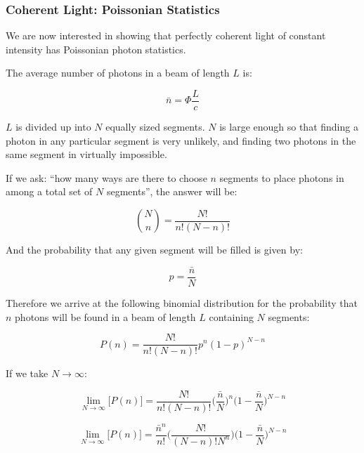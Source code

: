 \documentclass[12pt,a4paper]{report}
\begin{document}
\subsubsection{Coherent Light: Poissonian Statistics}\label{poissonian.statistics.with.photons}

We are now interested in showing that perfectly coherent light of constant intensity has Poissonian photon statistics.

The average number of photons in a beam of length $L$ is:

\begin{equation}
    \bar{n}=\Phi \frac{L}{c}
\end{equation}

$L$ is divided up into $N$ equally sized segments. $N$ is large enough so that finding a photon in any particular segment is very unlikely, and finding two photons in the same segment in virtually impossible.

If we ask: ``how many ways are there to choose $n$ segments to place photons in among a total set of $N$ segments'', the answer will be:

\begin{equation}
    \binom{N}{n} = \frac{N!}{n!(N-n)!}
\end{equation}

And the probability that any given segment will be filled is given by:

\begin{equation}
    p=\frac{\bar{n}}{N}
\end{equation}

Therefore we arrive at the following binomial distribution for the probability that $n$ photons will be found in a beam of length $L$ containing $N$ segments:

\begin{equation}
    P(n)=\frac{N!}{n!(N-n)!} p^n(1-p)^{N-n}
\end{equation}

If we take $N\rightarrow\infty$:

\begin{equation}
    \lim_{N\rightarrow\infty}\big[P(n)\big]=\frac{N!}{n!(N-n)!} \Big(\frac{\bar{n}}{N}\Big)^n\Big(1-\frac{\bar{n}}{N}\Big)^{N-n}
\end{equation}

\begin{equation}
    \lim_{N\rightarrow\infty}\big[P(n)\big]=\frac{\bar{n}^n}{n!}\Big(\frac{N!}{(N-n)!N^n}\Big)\Big(1-\frac{\bar{n}}{N}\Big)^{N-n}
\end{equation}
\end{document}
